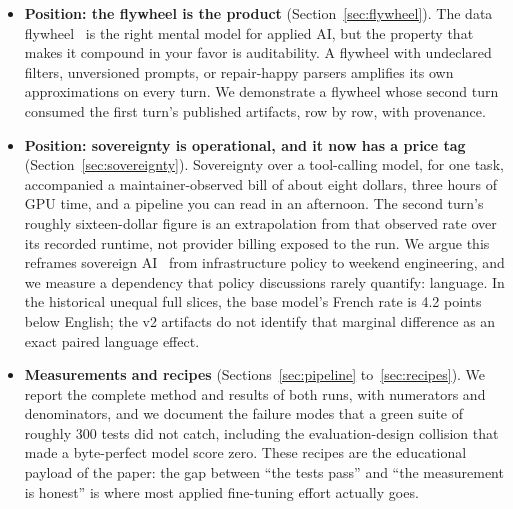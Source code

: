 \documentclass{article}
\begin{document}
\begin{itemize}
  \item \textbf{Position: the flywheel is the product} (Section~\ref{sec:flywheel}). The data flywheel~\citep{nvidia2026flywheel} is the right mental model for applied AI, but the property that makes it compound in your favor is auditability. A flywheel with undeclared filters, unversioned prompts, or repair-happy parsers amplifies its own approximations on every turn. We demonstrate a flywheel whose second turn consumed the first turn's published artifacts, row by row, with provenance.
  \item \textbf{Position: sovereignty is operational, and it now has a price tag} (Section~\ref{sec:sovereignty}). Sovereignty over a tool-calling model, for one task, accompanied a maintainer-observed bill of about eight dollars, three hours of GPU time, and a pipeline you can read in an afternoon. The second turn's roughly sixteen-dollar figure is an extrapolation from that observed rate over its recorded runtime, not provider billing exposed to the run. We argue this reframes sovereign AI~\citep{singh2025sovereignai,srivastava2024digitalsovereignty,nvidia2024sovereignai} from infrastructure policy to weekend engineering, and we measure a dependency that policy discussions rarely quantify: language. In the historical unequal full slices, the base model's French rate is 4.2 points below English; the v2 artifacts do not identify that marginal difference as an exact paired language effect.
  \item \textbf{Measurements and recipes} (Sections~\ref{sec:pipeline} to~\ref{sec:recipes}). We report the complete method and results of both runs, with numerators and denominators, and we document the failure modes that a green suite of roughly 300 tests did not catch, including the evaluation-design collision that made a byte-perfect model score zero. These recipes are the educational payload of the paper: the gap between ``the tests pass'' and ``the measurement is honest'' is where most applied fine-tuning effort actually goes.
\end{itemize}
\end{document}
